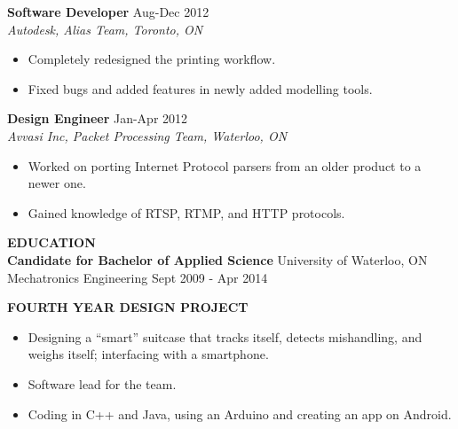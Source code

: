 \documentclass{letter}
\begin{document}
{\bf Software Developer} \hfill Aug-Dec 2012 \\
{\sl Autodesk, Alias Team, Toronto, ON}
\begin{itemize}
\item Completely redesigned the printing workflow.
\item Fixed bugs and added features in newly added modelling tools.
\end{itemize}

{\bf Design Engineer} \hfill Jan-Apr 2012 \\
{\sl Avvasi Inc, Packet Processing Team, Waterloo, ON}
\begin{itemize}
\item Worked on porting Internet Protocol parsers from an older product to a newer one.
\item Gained knowledge of RTSP, RTMP, and HTTP protocols.
\end{itemize}

{\large\bf EDUCATION} \\
{\bf Candidate for Bachelor of Applied Science} \hfill University of Waterloo, ON \\
Mechatronics Engineering \hfill Sept 2009 - Apr 2014

{\large\bf FOURTH YEAR DESIGN PROJECT}
\begin{itemize}
\item Designing a ``smart'' suitcase that tracks itself, detects mishandling, and weighs itself; interfacing with a smartphone.
\item Software lead for the team.
\item Coding in C++ and Java, using an Arduino and creating an app on Android.
\end{itemize}
\end{document}
